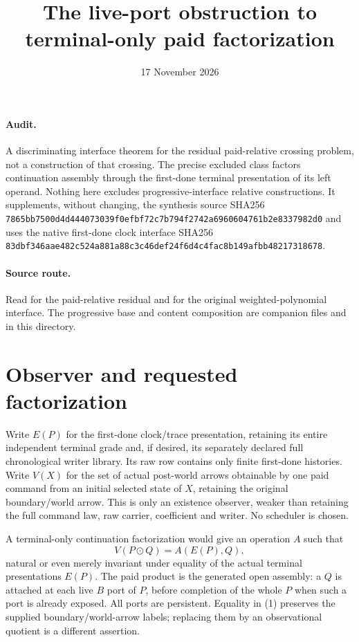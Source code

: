 \documentclass[11pt]{article}\usepackage{amsmath,amssymb,amsthm,geometry}\geometry{margin=1in}
\title{The live-port obstruction to terminal-only paid factorization}
\date{17 November 2026}
\begin{document}
\maketitle
\paragraph{Audit.} A discriminating interface theorem for the residual paid-relative crossing problem, not a construction of that crossing. The precise excluded class factors continuation assembly through the first-done terminal presentation of its left operand. Nothing here excludes progressive-interface relative constructions. It supplements, without changing, the synthesis source SHA256 \texttt{7865bb7500d4d444073039f0efbf72c7b794f2742a6960604761b2e8337982d0} and uses the native first-done clock interface SHA256 \texttt{83dbf346aae482c524a881a88c3c46def24f6d4c4fac8b149afbb48217318678}.

\paragraph{Source route.} Read \texttt{} for the paid-relative residual and \texttt{} for the original weighted-polynomial interface. The progressive base and content composition are companion files \texttt{} and \texttt{} in this directory.

\section{Observer and requested factorization}
Write $E(P)$ for the first-done clock/trace presentation, retaining its entire independent terminal grade and, if desired, its separately declared full chronological writer library. Its raw row contains only finite first-done histories. Write $V(X)$ for the set of actual post-world arrows obtainable by one paid command from an initial selected state of $X$, retaining the original boundary/world arrow. This is only an existence observer, weaker than retaining the full command law, raw carrier, coefficient and writer. No scheduler is chosen.

A terminal-only continuation factorization would give an operation $A$ such that
\[
 V(P\odot Q)=A(E(P),Q),                                      \tag{1}
\]
natural or even merely invariant under equality of the actual terminal presentations $E(P)$. The paid product is the generated open assembly: a $Q$ is attached at each live $B$ port of $P$, before completion of the whole $P$ when such a port is already exposed. All ports are persistent. Equality in (1) preserves the supplied boundary/world-arrow labels; replacing them by an observational quotient is a different assertion.
\end{document}

